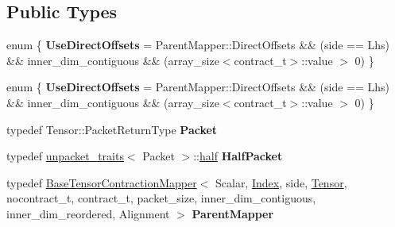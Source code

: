 \subsection*{Public Types}
\begin{DoxyCompactItemize}
\item 
\mbox{\label{class_eigen_1_1internal_1_1_tensor_contraction_sub_mapper_a765ebf80e2d822c6d21054843843bb6f}} 
enum \{ {\bfseries Use\+Direct\+Offsets} = Parent\+Mapper\+:\+:Direct\+Offsets \&\& (side == Lhs) \&\& inner\+\_\+dim\+\_\+contiguous \&\& (array\+\_\+size$<$contract\+\_\+t$>$\+:\+:value $>$ 0)
 \}
\item 
\mbox{\label{class_eigen_1_1internal_1_1_tensor_contraction_sub_mapper_ad5b6595de1a63e9c62e7dbdd0717e192}} 
enum \{ {\bfseries Use\+Direct\+Offsets} = Parent\+Mapper\+:\+:Direct\+Offsets \&\& (side == Lhs) \&\& inner\+\_\+dim\+\_\+contiguous \&\& (array\+\_\+size$<$contract\+\_\+t$>$\+:\+:value $>$ 0)
 \}
\item 
\mbox{\label{class_eigen_1_1internal_1_1_tensor_contraction_sub_mapper_a71f6f471254c5f71a3dfa47906abfaf0}} 
typedef Tensor\+::\+Packet\+Return\+Type {\bfseries Packet}
\item 
\mbox{\label{class_eigen_1_1internal_1_1_tensor_contraction_sub_mapper_a22336523c6f279227a96ed716eea3791}} 
typedef \hyperlink{struct_eigen_1_1internal_1_1unpacket__traits}{unpacket\+\_\+traits}$<$ Packet $>$\+::\hyperlink{struct_eigen_1_1half}{half} {\bfseries Half\+Packet}
\item 
\mbox{\label{class_eigen_1_1internal_1_1_tensor_contraction_sub_mapper_abf0feb0aaa5761497a177cb913be4d22}} 
typedef \hyperlink{class_eigen_1_1internal_1_1_base_tensor_contraction_mapper}{Base\+Tensor\+Contraction\+Mapper}$<$ Scalar, \hyperlink{namespace_eigen_a62e77e0933482dafde8fe197d9a2cfde}{Index}, side, \hyperlink{class_eigen_1_1_tensor}{Tensor}, nocontract\+\_\+t, contract\+\_\+t, packet\+\_\+size, inner\+\_\+dim\+\_\+contiguous, inner\+\_\+dim\+\_\+reordered, Alignment $>$ {\bfseries Parent\+Mapper}
\item 

\end{DoxyCompactItemize}
